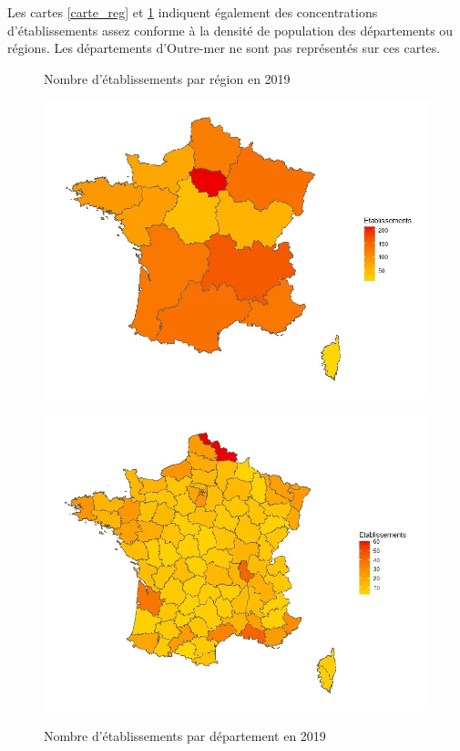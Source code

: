 Les cartes \ref{carte_reg} et \ref{carte_dep} indiquent également des concentrations d'établissements assez conforme à la densité de population des départements ou régions. Les départements d'Outre-mer ne sont pas représentés sur ces cartes.\\

\begin{figure}[!hb]
    \centering
    \begin{minipage}{0.45 \linewidth}
    
        \centering
        \caption{Nombre d'établissements par région en 2019}
        \includegraphics[width=1.1\linewidth]{Images/etablissement_reg_19.jpeg}
        \label{carte_reg}
    \end{minipage}
    \hfill
    \begin{minipage}{0.48 \linewidth}
        \centering
        \caption{Nombre d'établissements par département en 2019}
        \includegraphics[width=1.1\linewidth]{Images/etablissement_dep_19.jpeg}
        \label{carte_dep}
    \end{minipage}
\end{figure}

